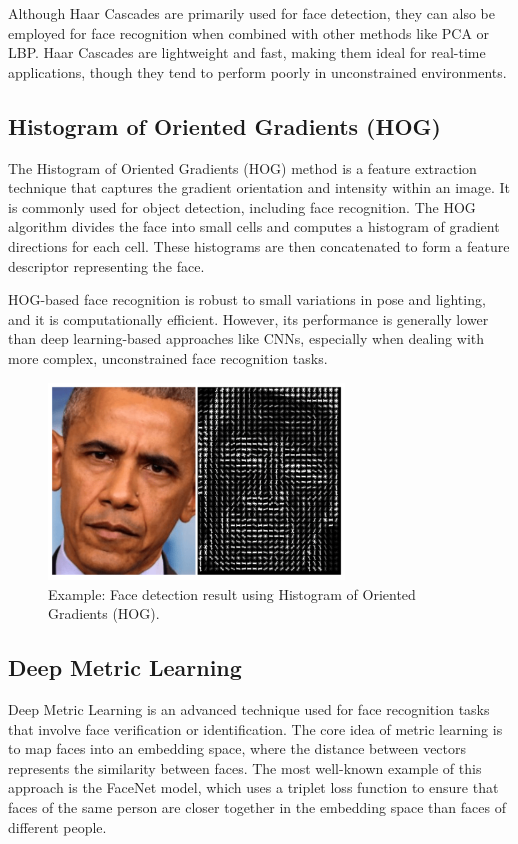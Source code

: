 Although Haar Cascades are primarily used for face detection, they can also be employed for face recognition when combined with other methods like PCA or LBP. Haar Cascades are lightweight and fast, making them ideal for real-time applications, though they tend to perform poorly in unconstrained environments.

\subsection{Histogram of Oriented Gradients (HOG)}
The Histogram of Oriented Gradients (HOG) method is a feature extraction technique that captures the gradient orientation and intensity within an image. It is commonly used for object detection, including face recognition. The HOG algorithm divides the face into small cells and computes a histogram of gradient directions for each cell. These histograms are then concatenated to form a feature descriptor representing the face.

HOG-based face recognition is robust to small variations in pose and lighting, and it is computationally efficient. However, its performance is generally lower than deep learning-based approaches like CNNs, especially when dealing with more complex, unconstrained face recognition tasks.

\begin{figure}[ht!]
    \centering
    \includegraphics[width=0.7\textwidth]{../Files/histagram_of_oriented_gradients.png}
    \caption{Example: Face detection result using Histogram of Oriented Gradients (HOG).}
    \label{fig:hog-example}
\end{figure}

\subsection{Deep Metric Learning}
Deep Metric Learning is an advanced technique used for face recognition tasks that involve face verification or identification. The core idea of metric learning is to map faces into an embedding space, where the distance between vectors represents the similarity between faces. The most well-known example of this approach is the FaceNet model, which uses a triplet loss function to ensure that faces of the same person are closer together in the embedding space than faces of different people.


